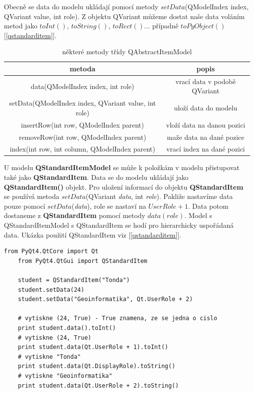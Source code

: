Obecně se data do modelu ukládají pomocí metody $setData$(QModelIndex index, QVariant value, int role). Z objektu QVariant můžeme dostat naše data voláním metod jako $toInt()$, $toString()$, $toRect()$... případně $toPyObject()$ [\autoref{qstandarditem}]. 


\begin{table}[h]	
	\centering
	\begin{tabular}{|c|c|}
		\hline	
		metoda & popis \\
		\hline
		\hline
		data(QModelIndex index, int role) & vrací data v podobě QVariant \\
		\hline
		setData(QModelIndex index, QVariant value, int role) & uloží data do modelu \\
		\hline
		insertRow(int row, QModelIndex parent) & vloží data na danou pozici \\
		\hline
		removeRow(int row, QModelIndex parent) & maže data na dané pozice \\
		\hline
		index(int row, int column, QModelIndex parent) & vrací index na dané pozici \\
		\hline


	\end{tabular}
	\caption{některé metody třídy QAbstractItemModel}
	\label{tab:qabsmodel}
\end{table}

U modelu \textbf{QStandardItemModel} se může k položkám v modelu přistupovat také jako \textbf{QStandardItem}. Data se do modelu ukládají jako \textbf{QStandardItem()} objekt. Pro uložení informací do objektu \textbf{QStandardItem} se používá metoda $setData$(QVariant \textit{data}, int \textit{role}). Pakliže nastavíme data pouze pomocí $setData$(\textit{data}), role se nastaví na $UserRole + 1$. Data potom dostaneme z \textbf{QStandardItem} pomocí metody $data(role)$. Model s QStandardItemModel s QStandardItem se hodí pro hierarchicky uspořádaná data. Ukázka použití QStandardItem viz [\autoref{qstandarditem}]. \\

\begin{lstlisting}[label=qstandarditem,caption={QStandardItem - vytvoření a získání dat}, morekeywords={PyQt4, QtCore, QtGui, QStandardItem, Qt, Qt.UserRole, Qt.DisplayRole}]
	from PyQt4.QtCore import Qt
	from PyQt4.QtGui import QStandardItem

	student = QStandardItem("Tonda")
	student.setData(24)
	student.setData("Geoinformatika", Qt.UserRole + 2)

	# vytiskne (24, True) - True znamena, ze se jedna o cislo
	print student.data().toInt() 					
	# vytiskne (24, True)
	print student.data(Qt.UserRole + 1).toInt()		
	# vytiskne "Tonda"
	print student.data(Qt.DisplayRole).toString() 	
	# vytiskne "Geoinformatika"
	print student.data(Qt.UserRole + 2).toString() 	

\end{lstlisting}

